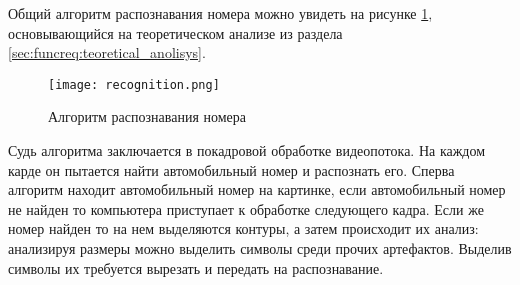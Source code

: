 Общий алгоритм распознавания номера можно увидеть на рисунке \ref{fig:arch:algorythm:image_processing_alg}, основывающийся на теоретическом анализе из раздела \ref{sec:funcreq:teoretical_anolisys}.
\begin{figure}[ht] 
    \centering
    \texttt{[image: recognition.png]}  
    \caption{Алгоритм распознавания номера}
    \label{fig:arch:algorythm:image_processing_alg}
\end{figure}
Судь алгоритма заключается в покадровой обработке видеопотока. На каждом карде он пытается найти автомобильный номер и распознать его. 
Сперва алгоритм находит автомобильный номер на картинке, если автомобильный номер не найден то компьютера приступает к обработке следующего кадра. Если же номер найден то на нем выделяются контуры, а затем происходит их анализ: анализируя размеры можно выделить символы среди прочих артефактов. Выделив символы их требуется вырезать и передать на распознавание. 
